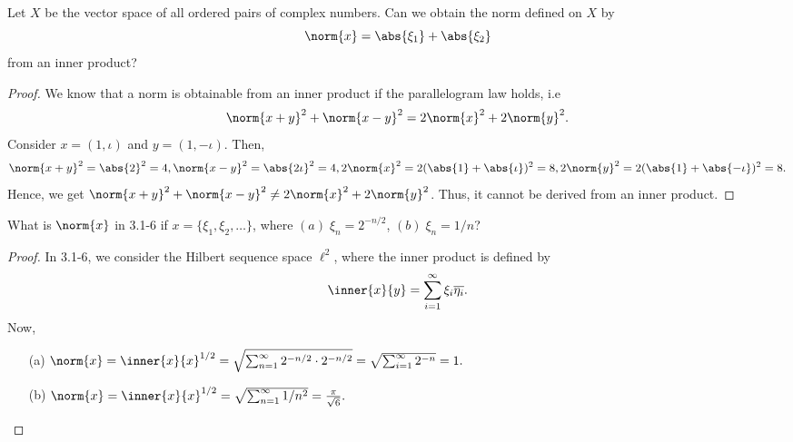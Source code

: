 \begin{question}
    Let $X$ be the vector space of all ordered pairs of complex numbers. Can we obtain the norm defined on $X$ by 
    \[\norm{x} = \abs{\xi_1} + \abs{\xi_2}\]
    from an inner product?
    \label{section3.1-11}
\end{question}
\begin{proof}
    We know that a norm is obtainable from an inner product if the parallelogram law holds, i.e
    \[\norm{x+y}^2 + \norm{x-y}^2 = 2\norm{x}^2 + 2\norm{y}^2.\]
    Consider $x = (1 , \iota)$ and $y = (1 , -\iota)$. Then, 
    \[\norm{x+y}^2 = \abs{2}^2  = 4 , \norm{x-y}^2 = \abs{2\iota}^2 = 4, 2\norm{x}^2 = 2(\abs{1} + \abs{\iota})^2 = 8, 2\norm{y}^2 = 2(\abs{1} + \abs{-\iota})^2 = 8.\]
    Hence, we get $\norm{x+y}^2 + \norm{x-y}^2 \neq 2\norm{x}^2 + 
    2\norm{y}^2$. Thus, it cannot be derived from an inner product.
\end{proof}

\begin{question}
   What is $\norm{x}$ in 3.1-6 if $x = \{\xi_1 , \xi_2 , \ldots\}$, where $(a)\; \xi_n = 2^{-n/2}$, $(b)\; \xi_n = 1/n$?
    \label{section3.1-12}
\end{question}
\begin{proof}
    In 3.1-6, we consider the Hilbert sequence space $\ell^2$, where the inner product is defined by
    \[\inner{x}{y} = \sum_{i=1}^\infty \xi_i \overline{\eta_i}.\]
    Now, 
    \begin{enumerate}
        \item[(a)] $\norm{x} = \inner{x}{x}^{1/2} = \sqrt{\sum_{n=1}^\infty 2^{-n/2} \cdot 2^{-n/2}} = \sqrt{\sum_{i=1}^\infty 2^{-n}} = 1.$
        \item[(b)] $\norm{x} = \inner{x}{x}^{1/2} = \sqrt{\sum_{n=1}^\infty 1/n^2} = \frac{\pi}{\sqrt{6}}. $ 
    \end{enumerate}
\end{proof}


